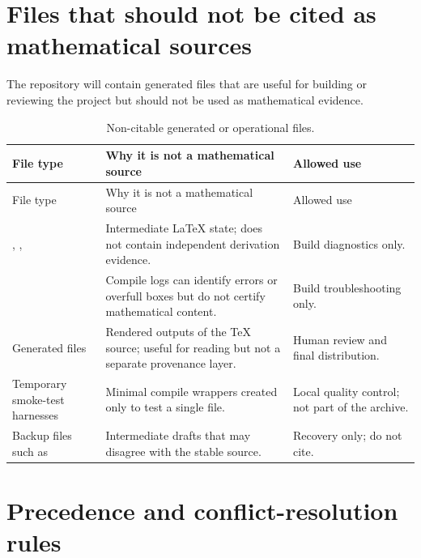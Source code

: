 \section{Files that should not be cited as mathematical sources}
\label{sec:non-citable-files}

The repository will contain generated files that are useful for building or reviewing the project but should not be used as mathematical evidence.

\begin{longtable}{@{}L{0.24\textwidth}L{0.56\textwidth}L{0.14\textwidth}@{}}
\caption{Non-citable generated or operational files.}\label{tab:non-citable-files}\\
\toprule
File type & Why it is not a mathematical source & Allowed use \\
\midrule
\endfirsthead
\toprule
File type & Why it is not a mathematical source & Allowed use \\
\midrule
\endhead
{}, ,  & Intermediate \LaTeX{} state; does not contain independent derivation evidence. & Build diagnostics only. \\
\addlinespace
{} & Compile logs can identify errors or overfull boxes but do not certify mathematical content. & Build troubleshooting only. \\
\addlinespace
Generated  files & Rendered outputs of the \TeX{} source; useful for reading but not a separate provenance layer. & Human review and final distribution. \\
\addlinespace
Temporary smoke-test harnesses & Minimal compile wrappers created only to test a single file. & Local quality control; not part of the archive. \\
\addlinespace
Backup files such as  & Intermediate drafts that may disagree with the stable source. & Recovery only; do not cite. \\
\bottomrule
\end{longtable}

\section{Precedence and conflict-resolution rules}
\label{sec:source-precedence-rules}

